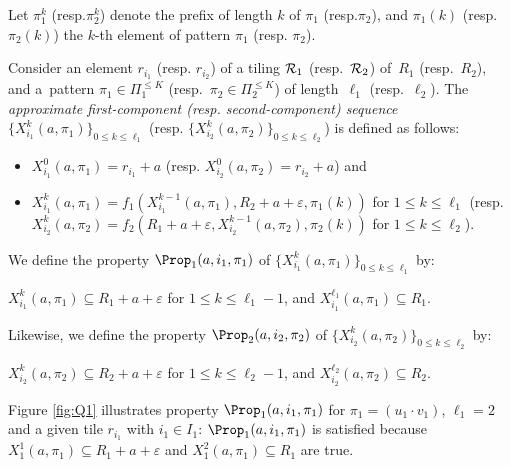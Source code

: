 Let $\pi_1^k$ (resp.$\pi_2^k$) denote the prefix of length $k$
of $\pi_1$ (resp.$\pi_2$), and $\pi_1(k)$ (resp. $\pi_2(k)$)
the $k$-th element of pattern $\pi_1$ (resp. $\pi_2$).
\begin{definition}\label{def:1}
Consider an element $r_{i_1}$ (resp. $r_{i_2}$) of a tiling ${\cal
  R}_1$ (resp.~${\cal R}_2$) of~$R_1$ (resp.~$R_2$), and a~pattern
${\pi_1\in\Pi_1^{\leq K}}$ (resp.~${\pi_2\in\Pi_2^{\leq K}}$) of
length~$\ell_1$ (resp.~$\ell_2$).  The \emph{approximate
  first-component (resp. second-component) sequence}
$\{X^k_{i_1}(a,\pi_1)\}_{0\leq k\leq \ell_1}$
(resp. $\{X^k_{i_2}(a,\pi_2)\}_{0\leq k\leq \ell_2}$) is defined as
follows:
\begin{itemize}
\item $X^0_{i_1}(a,\pi_1)=r_{i_1}+a$
  (resp. $X^0_{i_2}(a,\pi_2)=r_{i_2}+a$)
  and 
\item $X^{k}_{i_1}(a,\pi_1)=f_1(X^{k-1}_{i_1}(a,\pi_1),R_2+a+\varepsilon,\pi_1(k))$ for $1\leq k\leq \ell_1$
  (resp. $X^{k}_{i_2}(a,\pi_2)=f_2(R_1+a+\varepsilon,X^{k-1}_{i_2}(a,\pi_2),\pi_2(k))$
for $1\leq k\leq\ell_2$).
%
\end{itemize}
%
\end{definition}
%


We define the property
%
$\Prop_1(a,i_1,\pi_1)$ of $\{X^k_{i_1}(a,\pi_1)\}_{0\leq k\leq \ell_1}$ by:
\begin{center}
$X^{k}_{i_1}(a,\pi_1)\subseteq R_1+a+\varepsilon$ for $1\leq k\leq \ell_{1}-1$, and
$X_{i_1}^{\ell_{1}}(a,\pi_1)\subseteq R_1$.
\end{center}
%
Likewise, we define the property
%
$\Prop_2(a,i_2,\pi_2)$ of $\{X^k_{i_2}(a,\pi_2)\}_{0\leq k\leq \ell_2}$ by:
\begin{center}
$X^{k}_{i_2}(a,\pi_2)\subseteq R_2+a+\varepsilon$ for $1\leq k\leq \ell_{2}-1$, and
$X_{i_2}^{\ell_{2}}(a,\pi_2)\subseteq R_2$.
\end{center}
%
Figure \ref{fig:Q1} illustrates property $\Prop_1(a,i_1,\pi_1)$
for $\pi_1=(u_1\cdot v_1)$,
$\ell_1=2$ and a given tile $r_{i_1}$ with $i_1 \in I_1$:
 $\Prop_1(a,i_1,\pi_1)$ is satisfied because
$X_1^1(a,\pi_1)\subseteq R_1+a+\varepsilon$
and $X_1^2(a,\pi_1)\subseteq R_1$  are true.



